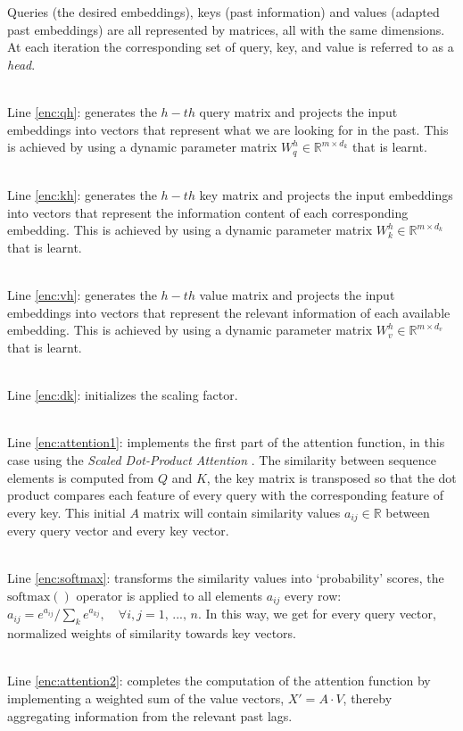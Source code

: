 \documentclass[algorithms,article,submit,pdftex,moreauthors]{Definitions/mdpi}
\begin{document}
Queries (the desired embeddings), keys (past information) and values (adapted past embeddings) are all represented by matrices, all with the same dimensions. At each iteration the corresponding set of query, key, and value is referred to as a \textit{head}.

~\\Line \ref{enc:qh}: generates the $h-th$ query matrix and projects the input embeddings into vectors that represent what we are looking for in the past. This is achieved by using a dynamic parameter matrix $W^h_q \in \mathbb{R}^{m \times d_k}$ that is learnt.

~\\Line \ref{enc:kh}: generates the $h-th$ key matrix and projects the input embeddings into vectors that represent the information content of each corresponding embedding. This is achieved by using a dynamic parameter matrix $W^h_k \in \mathbb{R}^{m \times d_k}$ that is learnt.

~\\Line \ref{enc:vh}: generates the $h-th$ value matrix and projects the input embeddings into vectors that represent the relevant information of each available embedding. This is achieved by using a dynamic parameter matrix $W^h_v \in \mathbb{R}^{m \times d_v}$ that is learnt.

~\\Line \ref{enc:dk}: initializes the scaling factor.

~\\Line \ref{enc:attention1}: implements the first part of the attention function, in this case using the \textit{Scaled Dot-Product Attention} \cite{VSPU17}. The similarity between sequence elements is computed from $Q$ and $K$, the key matrix is transposed so that the dot product compares each feature of every query with the corresponding feature of every key. This initial $A$ matrix will contain similarity values $a_{ij} \in \mathbb{R}$ between every query vector and every key vector.

~\\Line \ref{enc:softmax}: transforms the similarity values into `probability' scores, the $\text{softmax}()$ operator is applied to all elements $a_{ij}$ every row: $ a_{ij} = e^{a_{ij}} / \sum_k e^{a_{kj}},\quad \forall i,j  = 1,\,...,\,n $. In this way, we get for every query vector, normalized weights of similarity towards key vectors. 

~\\Line \ref{enc:attention2}: completes the computation of the attention function by implementing a weighted sum of the value vectors, $X' = A \cdot V$, thereby aggregating information from the relevant past lags.
\end{document}
